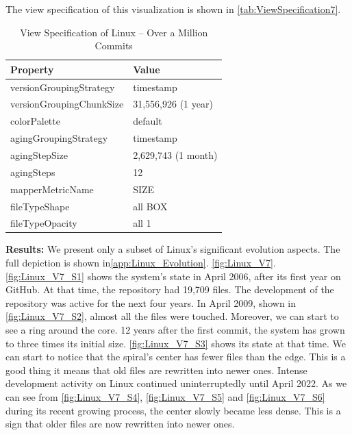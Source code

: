 The view specification of this visualization is shown in \autoref{tab:ViewSpecification7}.
\begin{table}[h]
	\small
    \centering
    \begin{tabular}{@{}ll@{}} 
        \toprule
        \textbf{Property} & \textbf{Value} \\\midrule
        versionGroupingStrategy & timestamp\\ 
		versionGroupingChunkSize & 31,556,926 (1 year)\\
		colorPalette & default\\
		agingGroupingStrategy & timestamp \\
		agingStepSize & 2,629,743 (1 month) \\
		agingSteps & 12 \\
		mapperMetricName & SIZE \\
		fileTypeShape & all BOX \\
		fileTypeOpacity & all 1 \\\bottomrule
    \end{tabular}
            \caption{View Specification of Linux – Over a Million Commits}
    \label{tab:ViewSpecification7}
\end{table}

\noindent
\textbf{Results:}
We present only a subset of Linux's significant evolution aspects. The full depiction is shown in\autoref{app:Linux_Evolution}. \autoref{fig:Linux_V7}. \autoref{fig:Linux_V7_S1} shows the system's state in April 2006, after its first year on GitHub. At that time, the repository had 19,709 files. The development of the repository was active for the next four years. In April 2009, shown in \autoref{fig:Linux_V7_S2}, almost all the files were touched. Moreover, we can start to see a ring around the core. 
12 years after the first commit, the system has grown to three times its initial size. \autoref{fig:Linux_V7_S3} shows its state at that time. We can start to notice that the spiral's center has fewer files than the edge. This is a good thing it means that old files are rewritten into newer ones. Intense development activity on Linux continued uninterruptedly until April 2022. As we can see from \autoref{fig:Linux_V7_S4}, \autoref{fig:Linux_V7_S5} and \autoref{fig:Linux_V7_S6} during its recent growing process, the center slowly became less dense. This is a sign that older files are now rewritten into newer ones. 

